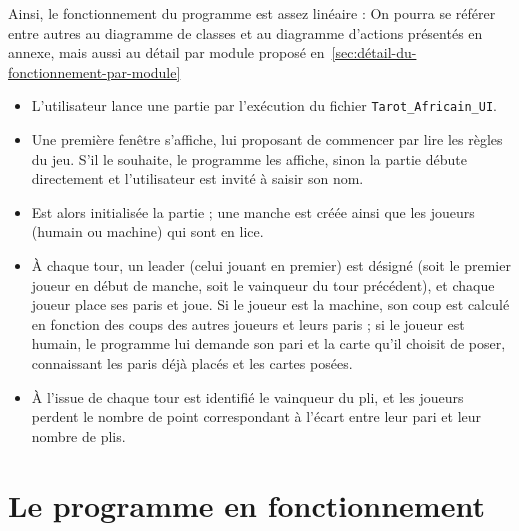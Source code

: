    Ainsi, le fonctionnement du programme est assez linéaire :
   On pourra se référer entre autres au diagramme de classes et au diagramme d'actions présentés en annexe, mais aussi au détail par module proposé en~\ref{sec:détail-du-fonctionnement-par-module}
   \begin{itemize}
      \item L'utilisateur lance une partie par l'exécution du fichier \texttt{Tarot\_Africain\_UI}.
      \item Une première fenêtre s'affiche, lui proposant de commencer par lire les règles du jeu.
      S'il le souhaite, le programme les affiche, sinon la partie débute directement et l'utilisateur est invité à saisir son nom.
      \item Est alors initialisée la partie ;
      une manche est créée ainsi que les joueurs (humain ou machine) qui sont en lice.
      \item À chaque tour, un leader (celui jouant en premier) est désigné (soit le premier joueur en début de manche, soit le vainqueur du tour précédent), et chaque joueur place ses paris et joue.
      Si le joueur est la machine, son coup est calculé en fonction des coups des autres joueurs et leurs paris ;
      si le joueur est humain, le programme lui demande son pari et la carte qu'il choisit de poser, connaissant les paris déjà placés et les cartes posées.
      \item À l'issue de chaque tour est identifié le vainqueur du pli, et les joueurs perdent le nombre de point correspondant à l'écart entre leur pari et leur nombre de plis.
   \end{itemize}

\section{Le programme en fonctionnement}\label{sec:le-programme-en-fonctionnement}

